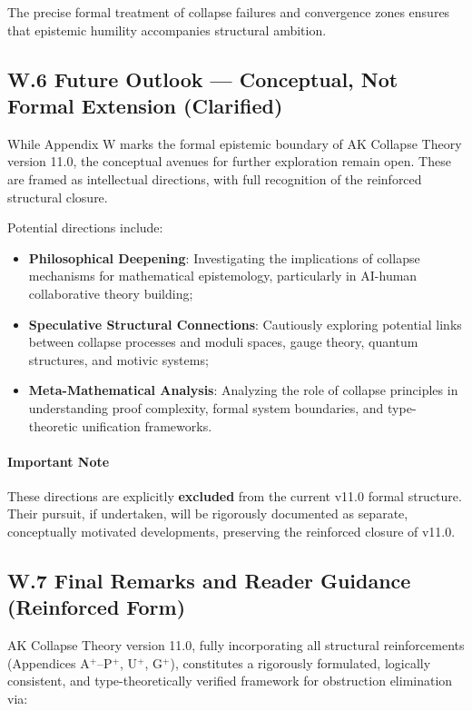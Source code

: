\documentclass[11pt]{article}
\begin{document}
The precise formal treatment of collapse failures and convergence zones ensures that epistemic humility accompanies structural ambition.

\subsection*{W.6 Future Outlook — Conceptual, Not Formal Extension (Clarified)}

While Appendix W marks the formal epistemic boundary of AK Collapse Theory version 11.0, the conceptual avenues for further exploration remain open. These are framed as intellectual directions, with full recognition of the reinforced structural closure.

Potential directions include:

\begin{itemize}
    \item \textbf{Philosophical Deepening}: Investigating the implications of collapse mechanisms for mathematical epistemology, particularly in AI-human collaborative theory building;
    \item \textbf{Speculative Structural Connections}: Cautiously exploring potential links between collapse processes and moduli spaces, gauge theory, quantum structures, and motivic systems;
    \item \textbf{Meta-Mathematical Analysis}: Analyzing the role of collapse principles in understanding proof complexity, formal system boundaries, and type-theoretic unification frameworks.
\end{itemize}

\paragraph{Important Note}  
These directions are explicitly \textbf{excluded} from the current v11.0 formal structure. Their pursuit, if undertaken, will be rigorously documented as separate, conceptually motivated developments, preserving the reinforced closure of v11.0.

\subsection*{W.7 Final Remarks and Reader Guidance (Reinforced Form)}

AK Collapse Theory version 11.0, fully incorporating all structural reinforcements (Appendices A$^{+}$–P$^{+}$, U$^{+}$, G$^{+}$), constitutes a rigorously formulated, logically consistent, and type-theoretically verified framework for obstruction elimination via:
\end{document}
